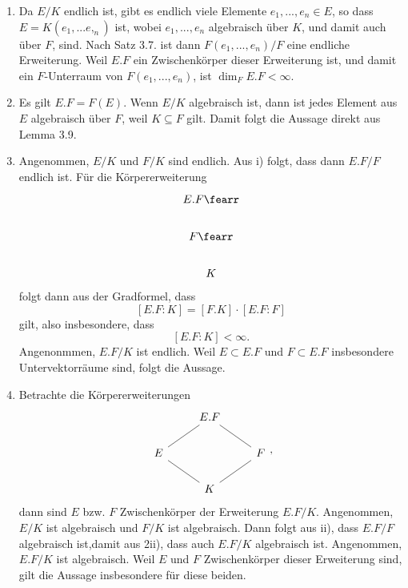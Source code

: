 \begin{gsol}
  \begin{enumerate}
    \item Da $E/K$ endlich ist, gibt es endlich viele Elemente $e_1,...,e_n\in E$, so dass $E=K(e_1,...e,_n)$ ist, wobei $e_1,...,e_n$ algebraisch über $K$, und damit auch über $F$, sind. Nach Satz 3.7. ist dann $F(e_1,...,e_n)/F$ eine endliche Erweiterung. Weil $E.F$ ein Zwischenkörper dieser Erweiterung ist, und damit ein $F$-Unterraum von $F(e_1,...,e_n)$, ist $\dim_FE.F<\infty$.
    \item Es gilt $E.F = F(E)$. Wenn $E/K$ algebraisch ist, dann ist jedes Element aus $E$ algebraisch über $F$, weil $K\subseteq F$ gilt. Damit folgt die Aussage direkt aus Lemma 3.9.
    \item Angenommen, $E/K$ und $F/K$ sind endlich. Aus i) folgt, dass dann $E.F/F$ endlich ist. Für die Körpererweiterung
    \[
    \begin{tikzcd}
      E.F\fearr\\
      F\fearr\\
      K
    \end{tikzcd}
    \]
    folgt dann aus der Gradformel, dass
    \[
    [E.F:K]=[F.K]\cdot [E.F:F]
    \]
    gilt, also insbesondere, dass
    \[
    [E.F:K]<\infty .
    \]
    Angenonmmen, $E.F/K$ ist endlich. Weil $E\subset E.F$ und $F\subset E.F$ insbesondere Untervektorräume sind, folgt die Aussage.
    \item Betrachte die Körpererweiterungen
    \[
    \begin{tikzcd}
      &E.F\ar[dash]{rd}\ar[dash]{ld}&\\
      E\ar[dash]{rd}&&F\ar[dash]{ld}\\
      &K&
    \end{tikzcd},
    \]
    dann sind $E$ bzw. $F$ Zwischenkörper der Erweiterung $E.F/K$. Angenommen, $E/K$ ist algebraisch und $F/K$ ist algebraisch. Dann folgt aus ii), dass $E.F/F$ algebraisch ist,damit aus 2ii), dass auch $E.F/K$ algebraisch ist. Angenommen, $E.F/K$ ist algebraisch. Weil $E$ und $F$ Zwischenkörper dieser Erweiterung sind, gilt die Aussage insbesondere für diese beiden.
  \end{enumerate}
\end{gsol}
